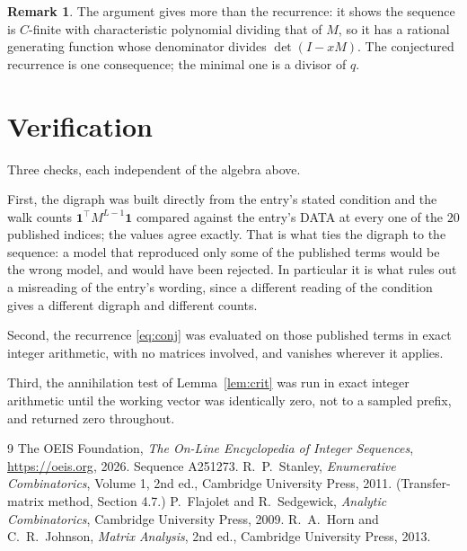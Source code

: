 \documentclass[11pt,a4paper]{article}
\theoremstyle{plain}
\theoremstyle{definition}
\newtheorem{remark}[theorem]{Remark}
\begin{document}
\begin{remark}
The argument gives more than the recurrence: it shows the sequence is $C$-finite with
characteristic polynomial dividing that of $M$, so it has a rational generating function
whose denominator divides $\det(I-xM)$. The conjectured recurrence is one consequence; the
minimal one is a divisor of $q$.
\end{remark}

\section{Verification}

Three checks, each independent of the algebra above.

First, the digraph was built directly from the entry's stated condition and the walk counts
$\mathbf{1}^{\!\top}M^{L-1}\mathbf{1}$ compared against the entry's DATA at
every one of the $20$ published indices; the values agree exactly. That is what ties
the digraph to the sequence: a model that reproduced only some of the published terms would
be the wrong model, and would have been rejected. In particular it is what rules out a
misreading of the entry's wording, since a different reading of the condition gives a
different digraph and different counts.

Second, the recurrence \eqref{eq:conj} was evaluated on those published terms in exact
integer arithmetic, with no matrices involved, and vanishes wherever it applies.

Third, the annihilation test of Lemma~\ref{lem:crit} was run in exact integer arithmetic
until the working vector was identically zero, not to a sampled prefix, and returned zero
throughout.

\begin{thebibliography}{9}
 The OEIS Foundation, \emph{The On-Line Encyclopedia of Integer
Sequences}, \url{https://oeis.org}, 2026. Sequence A251273.
 R.~P.~Stanley, \emph{Enumerative Combinatorics}, Volume 1, 2nd ed.,
Cambridge University Press, 2011. (Transfer-matrix method, Section 4.7.)
 P.~Flajolet and R.~Sedgewick, \emph{Analytic Combinatorics}, Cambridge
University Press, 2009.
 R.~A.~Horn and C.~R.~Johnson, \emph{Matrix Analysis}, 2nd ed., Cambridge
University Press, 2013.
\end{thebibliography}
\end{document}
